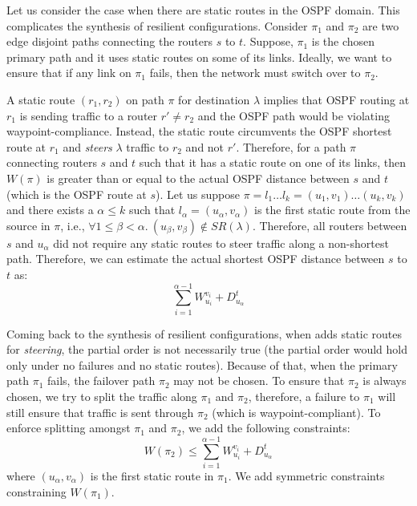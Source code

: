 Let us consider the case when there are static routes in the OSPF
domain. This complicates the synthesis of resilient configurations. 
Consider $\pi_1$ and $\pi_2$ are two edge disjoint paths 
connecting the routers $s$ to $t$. Suppose, $\pi_1$ is the 
chosen primary path and it uses static routes on 
some of its links.
Ideally, we want to ensure 
that if any link on $\pi_1$ fails, 
then the network must switch over to $\pi_2$. 

A static route $(r_1, r_2)$ on path $\pi$ for destination $\lambda$ implies that OSPF routing at $r_1$ is sending traffic to a 
router $r' \not= r_2$ and the OSPF path would be violating
waypoint-compliance. Instead, the static route circumvents 
the OSPF shortest route at $r_1$ and \emph{steers} $\lambda$ 
traffic to $r_2$ and not $r'$. Therefore, for a 
path $\pi$ connecting routers $s$ and $t$ such that it 
has a static route on one of its links, 
then $W(\pi)$ is greater than or equal to the 
actual OSPF distance
between $s$ and $t$ (which is the OSPF route at $s$).
Let us suppose $\pi = l_1 \ldots l_k = (u_1, v_1) \ldots (u_k, v_k)$ 
and 
there exists a $\alpha \leq k$ such that 
$l_\alpha = (u_\alpha, v_\alpha)$  
is the first 
static route from the source in $\pi$, i.e., 
$\forall 1 \leq \beta < \alpha. ~(u_\beta, v_\beta) \not\in SR(\lambda)$.
Therefore, all routers between $s$ and $u_\alpha$ did
not require any static routes to steer traffic along a 
non-shortest path. Therefore, we can estimate the 
actual shortest OSPF distance between $s$ to $t$ as:
\[
\sum_{i=1}^{\alpha - 1} W_{u_i}^{v_i} + D_{u_\alpha}^t
\]


Coming back to the synthesis of resilient configurations,
when \name adds static routes for \emph{steering},  
the partial order  is not necessarily true 
(the partial order would hold only under no failures and 
no static routes). 
Because of that, when the primary path $\pi_1$ fails, the 
failover path $\pi_2$ may not be chosen. To ensure that 
$\pi_2$ is always chosen, we try to split the traffic
along $\pi_1$ and $\pi_2$, therefore, a failure to $\pi_1$
will still ensure that traffic is sent through $\pi_2$ 
(which is waypoint-compliant). To enforce splitting amongst
$\pi_1$ and $\pi_2$, we add the following constraints: 
\begin{equation}
	W(\pi_2) \leq \sum_{i=1}^{\alpha - 1} W_{u_i}^{v_i} + D_{u_\alpha}^t	
\end{equation}
where $(u_\alpha, v_\alpha)$ is the first static route in $\pi_1$.
We add symmetric constraints constraining $W(\pi_1)$. 

